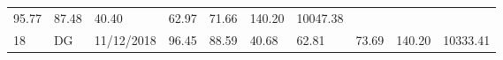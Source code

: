 \documentclass[
  11pt,
]{article}
\begin{document}
\begin{longtable}[]{@{}llllllllll@{}}
\begin{minipage}[t]{0.07\columnwidth}
95.77\strut
\end{minipage} & \begin{minipage}[t]{0.07\columnwidth}\raggedright
87.48\strut
\end{minipage} & \begin{minipage}[t]{0.07\columnwidth}\raggedright
40.40\strut
\end{minipage} & \begin{minipage}[t]{0.07\columnwidth}\raggedright
62.97\strut
\end{minipage} & \begin{minipage}[t]{0.07\columnwidth}\raggedright
71.66\strut
\end{minipage} & \begin{minipage}[t]{0.08\columnwidth}\raggedright
140.20\strut
\end{minipage} & \begin{minipage}[t]{0.09\columnwidth}\raggedright
10047.38\strut
\end{minipage}\tabularnewline
\begin{minipage}[t]{0.05\columnwidth}\raggedright
18\strut
\end{minipage} & \begin{minipage}[t]{0.07\columnwidth}\raggedright
DG\strut
\end{minipage} & \begin{minipage}[t]{0.11\columnwidth}\raggedright
11/12/2018\strut
\end{minipage} & \begin{minipage}[t]{0.07\columnwidth}\raggedright
96.45\strut
\end{minipage} & \begin{minipage}[t]{0.07\columnwidth}\raggedright
88.59\strut
\end{minipage} & \begin{minipage}[t]{0.07\columnwidth}\raggedright
40.68\strut
\end{minipage} & \begin{minipage}[t]{0.07\columnwidth}\raggedright
62.81\strut
\end{minipage} & \begin{minipage}[t]{0.07\columnwidth}\raggedright
73.69\strut
\end{minipage} & \begin{minipage}[t]{0.08\columnwidth}\raggedright
140.20\strut
\end{minipage} & \begin{minipage}[t]{0.09\columnwidth}\raggedright
10333.41\strut
\end{minipage}\tabularnewline

\end{longtable}
\end{document}
